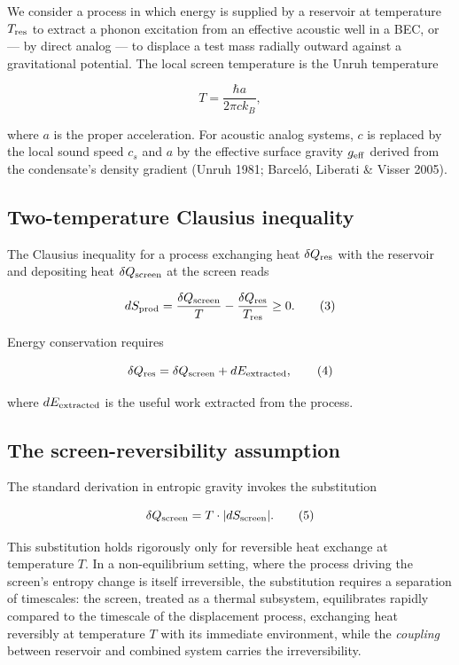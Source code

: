 \documentclass[11pt]{article}
\begin{document}
We consider a process in which energy is supplied by a reservoir at temperature \(T_{\rm res}\) to extract a phonon excitation from an effective acoustic well in a BEC, or --- by direct analog --- to displace a test mass radially outward against a gravitational potential. The local screen temperature is the Unruh temperature

\[T = \frac{\hbar a}{2\pi c k_B}, \tag{2}\]

where \(a\) is the proper acceleration. For acoustic analog systems, \(c\) is replaced by the local sound speed \(c_s\) and \(a\) by the effective surface gravity \(g_{\rm eff}\) derived from the condensate's density gradient (Unruh 1981; Barceló, Liberati \& Visser 2005).

\subsection{Two-temperature Clausius inequality}\label{two-temperature-clausius-inequality}

The Clausius inequality for a process exchanging heat \(\delta Q_{\rm res}\) with the reservoir and depositing heat \(\delta Q_{\rm screen}\) at the screen reads

\[dS_{\rm prod} = \frac{\delta Q_{\rm screen}}{T} - \frac{\delta Q_{\rm res}}{T_{\rm res}} \geq 0. \tag{3}\]

Energy conservation requires

\[\delta Q_{\rm res} = \delta Q_{\rm screen} + dE_{\rm extracted}, \tag{4}\]

where \(dE_{\rm extracted}\) is the useful work extracted from the process.

\subsection{The screen-reversibility assumption}\label{the-screen-reversibility-assumption}

The standard derivation in entropic gravity invokes the substitution

\[\delta Q_{\rm screen} = T \cdot |dS_{\rm screen}|. \tag{5}\]

This substitution holds rigorously only for reversible heat exchange at temperature \(T\). In a non-equilibrium setting, where the process driving the screen's entropy change is itself irreversible, the substitution requires a separation of timescales: the screen, treated as a thermal subsystem, equilibrates rapidly compared to the timescale of the displacement process, exchanging heat reversibly at temperature \(T\) with its immediate environment, while the \emph{coupling} between reservoir and combined system carries the irreversibility.
\end{document}
